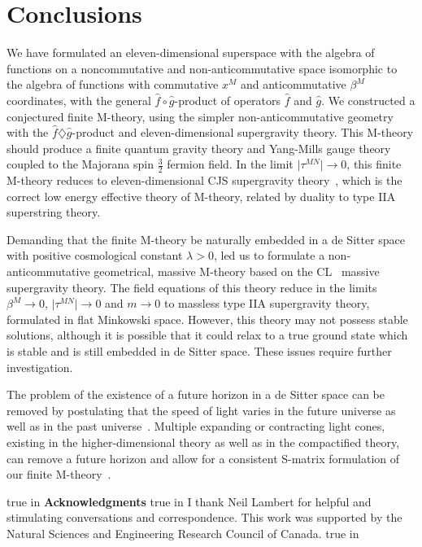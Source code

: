 \documentclass[a4paper,12pt]{article}
\begin{document}
\section{Conclusions}

We have formulated an
eleven-dimensional superspace with the algebra of functions on
a noncommutative and non-anticommutative space
isomorphic to the algebra of functions with commutative $x^M$ and
anticommutative $\beta^M$ coordinates, with the general ${\hat
f}\circ{\hat g}$-product of operators ${\hat f}$ and ${\hat g}$. We
constructed a conjectured finite M-theory, using the simpler
non-anticommutative geometry with the ${\hat f}\diamondsuit{\hat
g}$-product and eleven-dimensional
supergravity theory. This M-theory should produce a finite quantum gravity
theory and Yang-Mills gauge theory coupled to the Majorana spin
$\frac{3}{2}$ fermion field. In the limit $\vert\tau^{MN}\vert\rightarrow
0$, this finite M-theory reduces to eleven-dimensional CJS supergravity
theory~\cite{Julia}, which is the correct low energy effective theory of
M-theory, related by duality to type IIA superstring theory.

Demanding that the finite M-theory be naturally embedded in a de Sitter
space with positive cosmological constant $\lambda >0$, led us to
formulate a non-anticommutative geometrical, massive M-theory based on the
CL~\cite{Lambert} massive supergravity theory.
The field equations of this theory reduce in the limits
$\beta^M\rightarrow 0$, $\vert\tau^{MN}\vert\rightarrow 0$ and
$m\rightarrow 0$ to massless type IIA supergravity theory, formulated in
flat Minkowski space. However, this theory may not possess stable
solutions, although it is possible that it could relax to a true ground
state which is stable and is still embedded in de Sitter space. These
issues require further investigation.

The problem of the existence of a future horizon in a de Sitter space
can be removed by postulating that the speed of light varies in the future
universe as well as in the past universe~\cite{Moffat4}. Multiple expanding
or contracting light cones, existing in the higher-dimensional theory as
well as in the compactified theory, can remove a future horizon and allow
for a consistent S-matrix formulation of our finite
M-theory~\cite{Clayton,Drummond,Liberati}.

 true in
{\bf Acknowledgments}
 true in
I thank Neil Lambert for helpful and
stimulating conversations and correspondence. This work was supported by
the Natural Sciences and Engineering Research Council of Canada.
 true in
\end{document}

